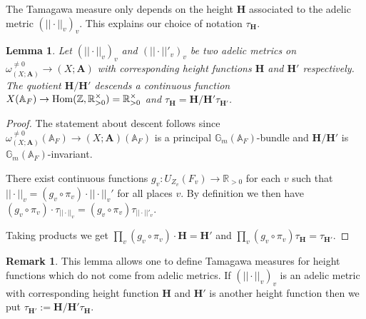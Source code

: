 \documentclass[a4paper,11pt,reqno]{amsart}
\newcommand{\R}{\mathbb{R}}
\newcommand{\G}{\mathbb{G}}
\newcommand{\A}{\mathbb{A}}
\DeclareMathOperator{\Hom}{Hom}
\newtheorem{lemma}[theorem]{Lemma}
\theoremstyle{definition}
\newtheorem{remark}[theorem]{Remark}
\begin{document}
The Tamagawa measure only depends on the height $\mathbf{H}$ associated to the adelic metric $(||\cdot||_v)_{v}$. This explains our choice of notation $\tau_{\mathbf{H}}$.
\begin{lemma}\label{lem:Tamagawa measure only depends on heigth function}
	Let $(||\cdot||_v)_v$ and $(||\cdot||'_v)_v$ be two adelic metrics on $\omega_{(X; \mathbf{A})}^{\neq 0} \to (X ; \mathbf{A})$ with corresponding height functions $\mathbf{H}$ and $\mathbf{H'}$ respectively. The quotient $\mathbf{H}/\mathbf{H}'$ descends a continuous function $X(\A_F) \to \Hom(\Z, \R^{\times}_{> 0}) = \R^{\times}_{> 0}$ and $\tau_{\mathbf{H}} = \mathbf{H}/\mathbf{H}' \tau_{\mathbf{H}'}$.
\end{lemma}
\begin{proof}
	The statement about descent follows since $\omega_{(X; \mathbf{A})}^{\neq 0}(\A_F) \to (X ; \mathbf{A})(\A_F)$ is a principal $\G_m(\A_F)$-bundle and $\mathbf{H}/\mathbf{H}'$ is $\G_m(\A_F)$-invariant.
	
	There exist continuous functions $g_v: U_{Z_v}(F_v) \to \R_{> 0}$ for each $v$ such that $|| \cdot ||_v = (g_v \circ \pi_v) \cdot ||\cdot||_v'$ for all places $v$. By definition we then have $(g_v \circ \pi_v) \cdot \tau_{||\cdot||_v} = (g_v \circ \pi_v) \tau_{||\cdot||'_v}$.
	
	Taking products we get $\prod_v (g_v \circ \pi_v) \cdot \mathbf{H} = \mathbf{H}'$ and $\prod_v (g_v \circ \pi_v) \tau_{\mathbf{H}} = \tau_{\mathbf{H}'}$.
\end{proof}
\begin{remark}
	This lemma allows one to define Tamagawa measures for height functions which do not come from adelic metrics. If $(||\cdot||_v)_v$ is an adelic metric with corresponding height function $\mathbf{H}$ and $\mathbf{H'}$ is another height function then we put
	$\tau_{\mathbf{H}'} := \mathbf{H}/\mathbf{H}' \tau_{\mathbf{H}}$.
\end{remark}
\end{document}
